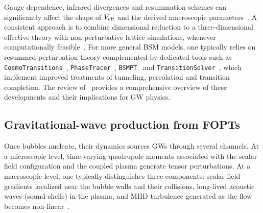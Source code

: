 \documentclass[a4paper,11pt]{article}
\begin{document}
Gauge dependence, infrared divergences and resummation schemes can significantly affect the shape of $V_{\rm eff}$ 
and the derived macroscopic parameters~\citep{Patel:2011th,Garny:2012cg,Ekstedt:2022bff}. A consistent approach 
is to combine dimensional reduction to a three-dimensional effective theory with non-perturbative lattice 
simulations, whenever computationally feasible~\citep{Kajantie:1995dw,Kajantie:1996mn,Laine:1998qk,
Gould:2021oba}. For more general BSM models, one typically relies on resummed perturbation theory complemented by dedicated tools such as \texttt{CosmoTransitions}~\citep{Wainwright:2011qy}, \texttt{PhaseTracer}~\citep{Athron:2019nbd}, \texttt{BSMPT}~\citep{Basler:2018cwe} and \texttt{TransitionSolver}~\citep{Athron:2022mmm}, which implement 
improved treatments of tunneling, percolation and transition completion. The review of~\citep{Athron:2023uxb} 
provides a comprehensive overview of these developments and their implications for GW physics.

\subsection{Gravitational-wave production from FOPTs}
\label{sec:gw-prod}

Once bubbles nucleate, their dynamics sources GWs through several channels. At a microscopic level, 
time-varying quadrupole moments associated with the scalar field configuration and the coupled plasma 
generate tensor perturbations. At a macroscopic level, one typically distinguishes three components: 
scalar-field gradients localized near the bubble walls and their collisions, long-lived acoustic waves 
(sound shells) in the plasma, and MHD turbulence generated as the flow becomes non-linear~\citep{Turner:1992tz,Kamionkowski:1993fg,Huber:2008hg,Caprini:2009dy,Hindmarsh:2015qta,
Hindmarsh:2017gnf}.
\end{document}
